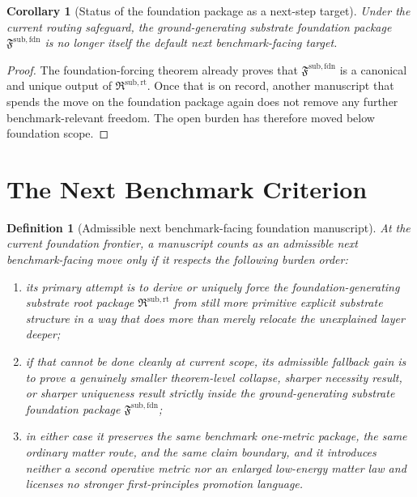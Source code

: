 \documentclass[11pt]{article}
\newcommand{\FoundationPackage}{\mathfrak F^{\mathrm{sub,fdn}}}
\newcommand{\RootPackage}{\mathfrak R^{\mathrm{sub,rt}}}
\newtheorem{definition}{Definition}
\newtheorem{corollary}{Corollary}
\begin{document}
\begin{corollary}[Status of the foundation package as a next-step target]
Under the current routing safeguard, the ground-generating substrate foundation package \(\FoundationPackage\) is no longer itself the default next benchmark-facing target.
\end{corollary}

\begin{proof}
The foundation-forcing theorem already proves that \(\FoundationPackage\) is a canonical and unique output of \(\RootPackage\). Once that is on record, another manuscript that spends the move on the foundation package again does not remove any further benchmark-relevant freedom. The open burden has therefore moved below foundation scope.
\end{proof}

\section{The Next Benchmark Criterion}

\begin{definition}[Admissible next benchmark-facing foundation manuscript]
At the current foundation frontier, a manuscript counts as an admissible next benchmark-facing move only if it respects the following burden order:
\begin{enumerate}
    \item its primary attempt is to derive or uniquely force the foundation-generating substrate root package \(\RootPackage\) from still more primitive explicit substrate structure in a way that does more than merely relocate the unexplained layer deeper;
    \item if that cannot be done cleanly at current scope, its admissible fallback gain is to prove a genuinely smaller theorem-level collapse, sharper necessity result, or sharper uniqueness result strictly inside the ground-generating substrate foundation package \(\FoundationPackage\);
    \item in either case it preserves the same benchmark one-metric package, the same ordinary matter route, and the same claim boundary, and it introduces neither a second operative metric nor an enlarged low-energy matter law and licenses no stronger first-principles promotion language.
\end{enumerate}
\end{definition}
\end{document}
